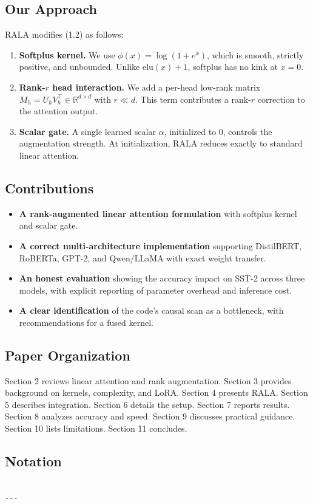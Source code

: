\subsection{Our Approach}

RALA modifies (1.2) as follows:

\begin{enumerate}
\item \textbf{Softplus kernel.} We use $\phi(x) = \log(1 + e^x)$, which is smooth,
  strictly positive, and unbounded. Unlike $\mathrm{elu}(x) + 1$, softplus
  has no kink at $x = 0$.

\item \textbf{Rank-$r$ head interaction.} We add a per-head low-rank matrix
  $M_h = U_h V_h^\top \in \mathbb{R}^{d \times d}$ with $r \ll d$. This
  term contributes a rank-$r$ correction to the attention output.

\item \textbf{Scalar gate.} A single learned scalar $\alpha$, initialized to $0$,
  controls the augmentation strength. At initialization, RALA reduces
  exactly to standard linear attention.

\end{enumerate}
\subsection{Contributions}

\begin{itemize}
\item \textbf{A rank-augmented linear attention formulation} with softplus kernel
  and scalar gate.
\item \textbf{A correct multi-architecture implementation} supporting DistilBERT,
  RoBERTa, GPT-2, and Qwen/LLaMA with exact weight transfer.
\item \textbf{An honest evaluation} showing the accuracy impact on SST-2 across three
  models, with explicit reporting of parameter overhead and inference cost.
\item \textbf{A clear identification} of the code's causal scan as a bottleneck,
  with recommendations for a fused kernel.

\end{itemize}
\subsection{Paper Organization}

Section 2 reviews linear attention and rank augmentation. Section 3 provides 
background on kernels, complexity, and LoRA. Section 4 presents RALA. Section 
5 describes integration. Section 6 details the setup. Section 7 reports 
results. Section 8 analyzes accuracy and speed. Section 9 discusses 
practical guidance. Section 10 lists limitations. Section 11 concludes.



\subsection{Notation}

\begin{lstlisting}

---
\end{lstlisting}